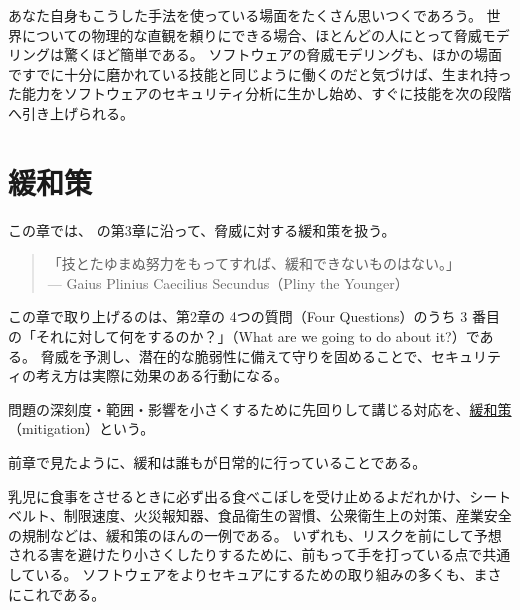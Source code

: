 \documentclass[uplatex]{jsarticle}
\def\label#1{}%
\begin{document}
あなた自身もこうした手法を使っている場面をたくさん思いつくであろう。
世界についての物理的な直観を頼りにできる場合、ほとんどの人にとって脅威モデリングは驚くほど簡単である。
ソフトウェアの脅威モデリングも、ほかの場面ですでに十分に磨かれている技能と同じように働くのだと気づけば、生まれ持った能力をソフトウェアのセキュリティ分析に生かし始め、すぐに技能を次の段階へ引き上げられる。

\newpage

\section{緩和策}

この章では、\cite{Kohnfelder2021} の第3章に沿って、脅威に対する緩和策を扱う。

\begin{quote}
「技とたゆまぬ努力をもってすれば、緩和できないものはない。」\\
\hfill --- Gaius Plinius Caecilius Secundus（Pliny the Younger）
\end{quote}

この章で取り上げるのは、第2章の 4つの質問（Four Questions）のうち 3 番目の「それに対して何をするのか？」（What are we going to do about it?）である。
脅威を予測し、潜在的な脆弱性に備えて守りを固めることで、セキュリティの考え方は実際に効果のある行動になる。

\begin{dfn}[緩和策]\label{dfn:ch3-mitigation}
問題の深刻度・範囲・影響を小さくするために先回りして講じる対応を、\underline{緩和策}（mitigation）という。
\end{dfn}

前章で見たように、緩和は誰もが日常的に行っていることである。

\begin{exa}[身の回りの緩和策]\label{exa:ch3-everyday-mitigations}
乳児に食事をさせるときに必ず出る食べこぼしを受け止めるよだれかけ、シートベルト、制限速度、火災報知器、食品衛生の習慣、公衆衛生上の対策、産業安全の規制などは、緩和策のほんの一例である。
いずれも、リスクを前にして予想される害を避けたり小さくしたりするために、前もって手を打っている点で共通している。
ソフトウェアをよりセキュアにするための取り組みの多くも、まさにこれである。
\end{exa}
\end{document}
